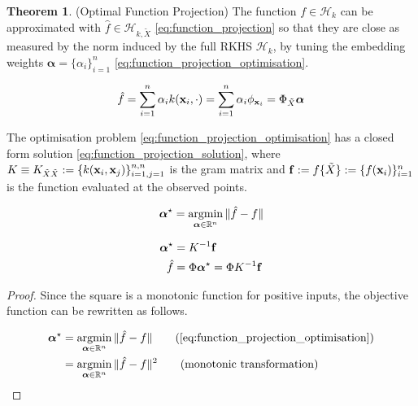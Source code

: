 \documentclass[twoside]{article} \usepackage{aistats2017}
\theoremstyle{definition}
\newtheorem{theorem}{Theorem}[section]
\newcommand{\argmin}{\operatornamewithlimits{argmin}}
\newcommand{\ds}[1]{\tilde{#1}}
\begin{document}
	\begin{theorem} \label{thm:function_projection_solution}
		(Optimal Function Projection)
		The function $f \in \mathcal{H}_{k}$ can be approximated with $\hat{f} \in \mathcal{H}_{k, \ds{X}}$ \eqref{eq:function_projection} so that they are close as measured by the norm induced by the full RKHS $\mathcal{H}_{k}$, by tuning the embedding weights $\bm{\alpha} = \{\alpha_{i}\}_{i = 1}^{n}$ \eqref{eq:function_projection_optimisation}.
		
		\begin{equation}
			\hat{f} = \sum_{i = 1}^{n} \alpha_{i} k(\bvec{x}_{i}, \cdot) = \sum_{i = 1}^{n} \alpha_{i} \phi_{\bvec{x}_{i}} = \Phi_{\ds{X}} \bm{\alpha}
		\label{eq:function_projection}
		\end{equation}

		The optimisation problem \eqref{eq:function_projection_optimisation} has a closed form solution \eqref{eq:function_projection_solution}, where $K \equiv K_{\ds{X} \ds{X}} := \{k(\bvec{x}_{i}, \bvec{x}_{j})\}_{i = 1, j = 1}^{n, n}$ is the gram matrix and $\bvec{f} := f\{\ds{X}\} := \{f(\bvec{x}_{i})\}_{i = 1}^{n}$ is the function evaluated at the observed points.
			
		\begin{equation}
			\bm{\alpha}^{\star} = \argmin_{\bm{\alpha} \in \mathbb{R}^{n}} \Vert \hat{f} - f \Vert
		\label{eq:function_projection_optimisation}
		\end{equation}
		
		\begin{equation}
		\begin{aligned}
			\bm{\alpha}^{\star} &= K^{-1} \mathbf{f} \\
			\hat{f} &= \Phi \bm{\alpha}^{\star} = \Phi K^{-1} \mathbf{f}
		\label{eq:function_projection_solution}
		\end{aligned}
		\end{equation}
			
		\begin{proof}
			Since the square is a monotonic function for positive inputs, the objective function can be rewritten as follows.
			
			\begin{align*}
				\bm{\alpha}^{\star} &= \argmin_{\bm{\alpha} \in \mathbb{R}^{n}} \Vert \hat{f} - f \Vert \tag{\cref{eq:function_projection_optimisation}} \\
				&= \argmin_{\bm{\alpha} \in \mathbb{R}^{n}} \Vert \hat{f} - f \Vert^{2} \tag{monotonic transformation}
			\end{align*}
			

\end{proof}
\end{theorem}
\end{document}
